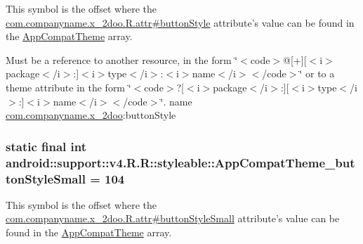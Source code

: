 This symbol is the offset where the \hyperlink{classcom_1_1companyname_1_1x__2doo_1_1_r_1_1attr_31a5d6dfc676aac5605feadd0269e3bc}{com.companyname.x\_\-2doo.R.attr\#buttonStyle} attribute's value can be found in the \hyperlink{classandroid_1_1support_1_1v4_1_1_r_1_1styleable_0873e92ba21076bb5a4aeadeb7f5779f}{AppCompatTheme} array.

Must be a reference to another resource, in the form \char`\"{}$<$code$>$@\mbox{[}+\mbox{]}\mbox{[}$<$i$>$package$<$/i$>$:\mbox{]}$<$i$>$type$<$/i$>$:$<$i$>$name$<$/i$>$$<$/code$>$\char`\"{} or to a theme attribute in the form \char`\"{}$<$code$>$?\mbox{[}$<$i$>$package$<$/i$>$:\mbox{]}\mbox{[}$<$i$>$type$<$/i$>$:\mbox{]}$<$i$>$name$<$/i$>$$<$/code$>$\char`\"{}.  name \hyperlink{namespacecom_1_1companyname_1_1x__2doo}{com.companyname.x\_\-2doo}:buttonStyle \hypertarget{classandroid_1_1support_1_1v4_1_1_r_1_1styleable_71e1206792e08e069496577fcab26e1b}{
\subsubsection[{AppCompatTheme\_\-buttonStyleSmall}]{\setlength{\rightskip}{0pt plus 5cm}static final int android::support::v4.R.R::styleable::AppCompatTheme\_\-buttonStyleSmall = 104}}
\label{classandroid_1_1support_1_1v4_1_1_r_1_1styleable_71e1206792e08e069496577fcab26e1b}


This symbol is the offset where the \hyperlink{classcom_1_1companyname_1_1x__2doo_1_1_r_1_1attr_182869530f662cd82b6091bfa78309dc}{com.companyname.x\_\-2doo.R.attr\#buttonStyleSmall} attribute's value can be found in the \hyperlink{classandroid_1_1support_1_1v4_1_1_r_1_1styleable_0873e92ba21076bb5a4aeadeb7f5779f}{AppCompatTheme} array.

